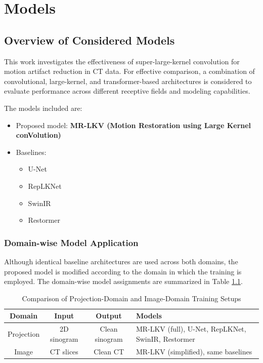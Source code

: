 \chapter{Models}
\label{chap:models}
\section{Overview of Considered Models}
This work investigates the effectiveness of super-large-kernel convolution for motion artifact reduction in CT data. 
For effective comparison, a combination of convolutional, large-kernel, and transformer-based architectures is considered to evaluate performance across different receptive fields and modeling capabilities.

The models included are:

\begin{itemize}
    \item Proposed model: \textbf{MR-LKV (Motion Restoration using Large Kernel conVolution)} 
        \item Baselines: 
    \begin{itemize}
        \item U-Net ~\cite{ronneberger2015unet}
        \item RepLKNet ~\cite{replknet2022}
        \item SwinIR  ~\cite{liang2021swinir}
        \item Restormer ~\cite{restormer2022}
    \end{itemize}
\end{itemize}
\subsection{Domain-wise Model Application}

Although identical baseline architectures are used across both domains, the proposed model is modified according to the domain in which the training is employed. 
The domain-wise model assignments are summarized in Table \ref{tab:domain_comparison}. 

\begin{table}[htpb]
\centering
\caption{Comparison of Projection-Domain and Image-Domain Training Setups}
\small
\begin{tabular}{|c|c|c|p{6cm}|}
\hline
\textbf{Domain} & \textbf{Input} & \textbf{Output} & \textbf{Models} \\ \hline

Projection & 2D sinogram & Clean sinogram & MR-LKV (full), U-Net, RepLKNet, SwinIR, Restormer \\ \hline

Image & CT slices & Clean CT & MR-LKV (simplified), same baselines \\ \hline

\end{tabular}
\label{tab:domain_comparison}
\end{table}
